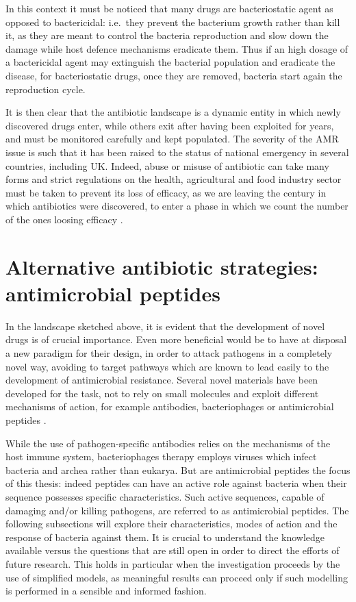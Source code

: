 In this context it must be noticed that many drugs are bacteriostatic agent as opposed to bactericidal: i.e.\ they prevent the bacterium growth rather than kill it, as they are meant to control the bacteria reproduction and slow down the damage while host defence mechanisms eradicate them.
%
Thus if an high dosage of a bactericidal agent may extinguish the bacterial population and eradicate the disease, for bacteriostatic drugs, once they are removed, bacteria start again the reproduction cycle.

It is then clear that the antibiotic landscape is a dynamic entity in which newly discovered drugs enter, while others exit after having been exploited for years, and must be monitored carefully and kept populated. The severity of the AMR issue is such that it has been raised to the status of national emergency in several countries, including UK. Indeed, abuse or misuse of antibiotic can take many forms and strict regulations on the health, agricultural and food industry sector must be taken to prevent its loss of efficacy, as we are leaving the century in which antibiotics were discovered, to enter a phase in which we count the number of the ones loosing efficacy \cite{Oneill2016}.


\section{Alternative antibiotic strategies: antimicrobial peptides}
In the landscape sketched above, it is evident that the development of novel drugs is of crucial importance. Even more beneficial would be to have at disposal a new paradigm for their design, in order to attack pathogens in a completely novel way, avoiding to target pathways which are known to lead easily to the development of antimicrobial resistance. Several novel materials have been developed for the task, not to rely on small molecules and exploit different mechanisms of action, for example antibodies, bacteriophages or antimicrobial peptides \cite{Mantravadi2019}.

While the use of pathogen-specific antibodies relies on the mechanisms of the host immune system, bacteriophages therapy employs viruses which infect bacteria and archea rather than eukarya.
%
But are antimicrobial peptides the focus of this thesis: indeed peptides can have an active role against bacteria when their sequence possesses specific characteristics. Such active sequences, capable of damaging and/or killing pathogens, are referred to as antimicrobial peptides. The following subsections will explore their characteristics, modes of action and the response of bacteria against them. It is crucial to understand the knowledge available versus the questions that are still open in order to direct the efforts of future research. This holds in particular when the investigation proceeds by the use of simplified models, as meaningful results can proceed only if such modelling is performed in a sensible and informed fashion.

